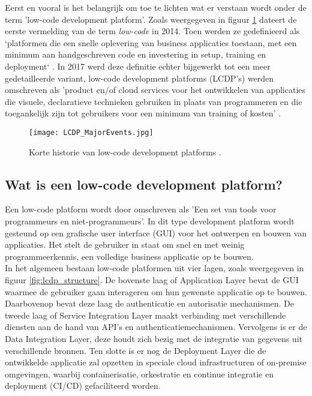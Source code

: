 Eerst en vooral is het belangrijk om toe te lichten wat er verstaan wordt onder de term 'low-code development platform'. Zoals weergegeven in figuur \ref{fig:lcdp_history} dateert de eerste vermelding van de term \textit{low-code} in 2014. Toen werden ze gedefinieerd als `platformen die een snelle oplevering van business applicaties toestaan, met een minimum aan handgeschreven code en investering in setup, training en deployment` \autocite{Ruscio2022}. In 2017 werd deze definitie echter bijgewerkt tot een meer gedetailleerde variant, low-code development platforms (LCDP's) werden omschreven als 'product en/of cloud services voor het ontwikkelen van applicaties die visuele, declaratieve technieken gebruiken in plaats van programmeren en die toegankelijk zijn tot gebruikers voor een minimum van training of kosten' \autocite{Ruscio2022}. \\

\begin{figure}[hb]
    \centering
    \texttt{[image: LCDP\_MajorEvents.jpg]}
    \caption[Geschiedenis low-code development platforms]{Korte historie van low-code development platforms \autocite{Ruscio2022}.}
    \label{fig:lcdp_history}
\end{figure}

\subsection{Wat is een low-code development platform?}
\label{subsec:what_is_low_code}

Een low-code platform wordt door \textcite{Waszkowski2019} omschreven als 'Een set van tools voor programmeurs en niet-programmeurs'. In dit type development platform wordt gesteund op een grafische user interface (GUI) voor het ontwerpen en bouwen van applicaties. Het stelt de gebruiker in staat om snel en met weinig programmeerkennis, een volledige business applicatie op te bouwen. \\

In het algemeen bestaan low-code platformen uit vier lagen, zoals weergegeven in figuur \ref{fig:lcdp_structure}. De bovenste laag of Application Layer bevat de GUI waarmee de gebruiker gaan interageren om hun gewenste applicatie op te bouwen. Daarbovenop bevat deze laag de authenticatie en autorisatie mechanismen. De tweede laag of Service Integration Layer maakt verbinding met verschillende diensten aan de hand van API's en authenticatiemechanismen. Vervolgens is er de Data Integration Layer, deze houdt zich bezig met de integratie van gegevens uit verschillende bronnen. Ten slotte is er nog de Deployment Layer die de ontwikkelde applicatie zal opzetten in speciale cloud infrastructuren of on-premise omgevingen, waarbij containerisatie, orkestratie en continue integratie en deployment (CI/CD) gefaciliteerd worden. \\

